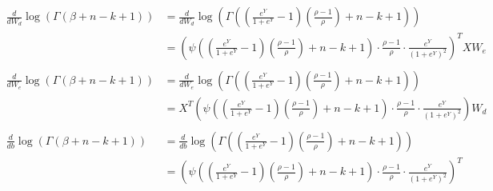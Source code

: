 \documentclass[12pt,a4paper]{article}
\begin{document}
\begin{align*}
\frac{d}{d W_{d}} \log(\Gamma(\beta + n - k + 1)) &= \frac{d}{d W_{d}} \log\left(\Gamma\left(\left(\frac{e^{Y}}{1+e^{Y}} - 1\right)\left(\frac{\rho - 1}{\rho}\right) + n - k + 1 \right)\right)\\
&= \left(\psi\left(\left(\frac{e^{Y}}{1+e^{Y}} - 1\right)\left(\frac{\rho - 1}{\rho}\right) + n - k + 1 \right) \cdot \frac{\rho - 1}{\rho} \cdot \frac{e^{Y}}{\left(1+e^{Y}\right)^2} \right)^T XW_e \\
\ \\
\frac{d}{d W_{e}} \log(\Gamma(\beta + n - k + 1)) &= \frac{d}{d W_{e}} \log\left(\Gamma\left(\left(\frac{e^{Y}}{1+e^{Y}} - 1\right)\left(\frac{\rho - 1}{\rho}\right) + n - k + 1 \right)\right)\\
&= X^T \left(\psi\left(\left(\frac{e^{Y}}{1+e^{Y}} - 1\right)\left(\frac{\rho - 1}{\rho}\right) + n - k + 1 \right) \cdot \frac{\rho - 1}{\rho} \cdot \frac{e^{Y}}{\left(1+e^{Y}\right)^2} \right) W_d \\
\ \\
\frac{d}{d b} \log(\Gamma(\beta + n - k + 1)) &= \frac{d}{d b} \log\left(\Gamma\left(\left(\frac{e^{Y}}{1+e^{Y}} - 1\right)\left(\frac{\rho - 1}{\rho}\right) + n - k + 1 \right)\right)\\
&= \left(\psi\left(\left(\frac{e^{Y}}{1+e^{Y}} - 1\right)\left(\frac{\rho - 1}{\rho}\right) + n - k + 1 \right) \cdot \frac{\rho - 1}{\rho} \cdot \frac{e^{Y}}{\left(1+e^{Y}\right)^2} \right)^T
\end{align*}
\end{document}

